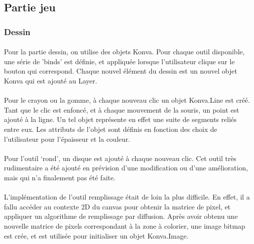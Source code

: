 \documentclass[11pt,a4paper]{article}
\begin{document}
        \subsection{Partie jeu}
            \subsubsection{Dessin}
                \paragraph{}
                Pour la partie dessin, on utilise des objets Konva.
                Pour chaque outil disponible, une série de 'binds' est définie,
                et appliquée lorsque l'utilisateur clique sur le bouton qui correspond.
                Chaque nouvel élément du dessin est un nouvel objet Konva qui est ajouté au Layer.
                \paragraph{}
                Pour le crayon ou la gomme, à chaque nouveau clic un objet Konva.Line est créé.
                Tant que le clic est enfoncé, et à chaque mouvement de la souris, un point est ajouté à la ligne.
                Un tel objet représente en effet une suite de segments reliés entre eux.
                Les attributs de l'objet sont définis en fonction des choix de l'utilisateur pour l'épaisseur et la couleur.
                \paragraph{}
                Pour l'outil `rond', un disque est ajouté à chaque nouveau clic.
                Cet outil très rudimentaire a été ajouté en prévision d'une modification ou d'une amélioration,
                mais qui n'a finalement pas été faite.
                \paragraph{}
                L'implémentation de l'outil remplissage était de loin la plus difficile.
                En effet, il a fallu accéder au contexte 2D du canvas pour obtenir la matrice de pixel,
                et appliquer un algorithme de remplissage par diffusion.
                Après avoir obtenu une nouvelle matrice de pixels correspondant à la zone à colorier,
                une image bitmap est crée, et est utilisée pour initialiser un objet Konva.Image.
\end{document}

